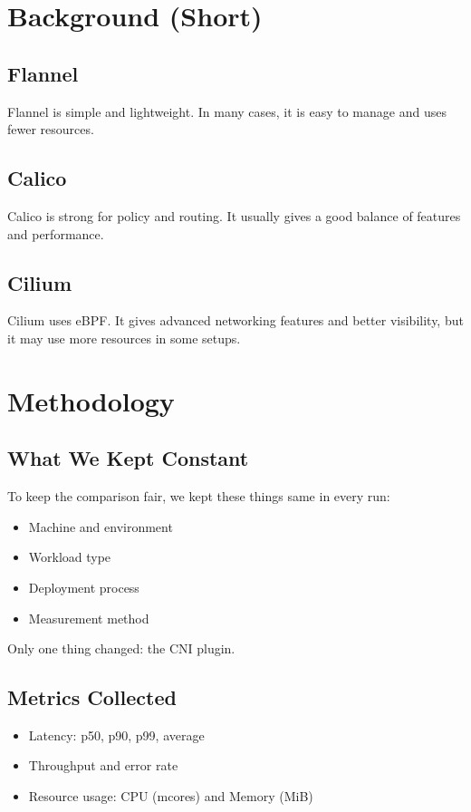 \documentclass[12pt,a4paper]{article}
\begin{document}
\section{Background (Short)}
\subsection{Flannel}
Flannel is simple and lightweight. In many cases, it is easy to manage and uses fewer resources.

\subsection{Calico}
Calico is strong for policy and routing. It usually gives a good balance of features and performance.

\subsection{Cilium}
Cilium uses eBPF. It gives advanced networking features and better visibility, but it may use more resources in some setups.

\section{Methodology}
\subsection{What We Kept Constant}
To keep the comparison fair, we kept these things same in every run:
\begin{itemize}[leftmargin=1.5em]
    \item Machine and environment
    \item Workload type
    \item Deployment process
    \item Measurement method
\end{itemize}

Only one thing changed: the CNI plugin.

\subsection{Metrics Collected}
\begin{itemize}[leftmargin=1.5em]
    \item Latency: p50, p90, p99, average
    \item Throughput and error rate
    \item Resource usage: CPU (mcores) and Memory (MiB)
\end{itemize}
\end{document}

